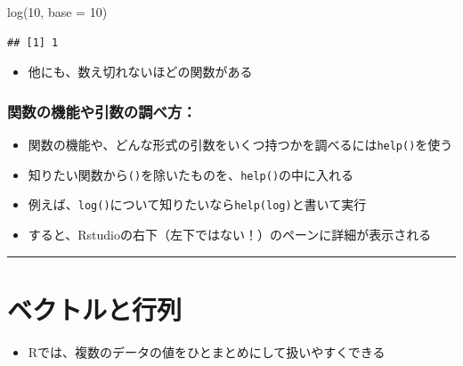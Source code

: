 \documentclass[
]{book}
\newenvironment{Shaded}{\begin{snugshade}}{\end{snugshade}}
\newcommand{\AttributeTok}[1]{\textcolor[rgb]{0.77,0.63,0.00}{#1}}
\newcommand{\DecValTok}[1]{\textcolor[rgb]{0.00,0.00,0.81}{#1}}
\newcommand{\FunctionTok}[1]{\textcolor[rgb]{0.00,0.00,0.00}{#1}}
\newcommand{\NormalTok}[1]{#1}
\providecommand{\tightlist}{%
  \setlength{\itemsep}{0pt}\setlength{\parskip}{0pt}}
\begin{document}
\begin{Shaded}
\begin{Highlighting}[]
\FunctionTok{log}\NormalTok{(}\DecValTok{10}\NormalTok{, }\AttributeTok{base =} \DecValTok{10}\NormalTok{)}
\end{Highlighting}
\end{Shaded}

\begin{verbatim}
## [1] 1
\end{verbatim}

\begin{itemize}
\tightlist
\item
  他にも、数え切れないほどの関数がある
\end{itemize}

\hypertarget{ux95a2ux6570ux306eux6a5fux80fdux3084ux5f15ux6570ux306eux8abfux3079ux65b9}{%
\subsubsection*{関数の機能や引数の調べ方：}\label{ux95a2ux6570ux306eux6a5fux80fdux3084ux5f15ux6570ux306eux8abfux3079ux65b9}}

\begin{itemize}
\tightlist
\item
  関数の機能や、どんな形式の引数をいくつ持つかを調べるには\texttt{help()}を使う
\item
  知りたい関数から\texttt{()}を除いたものを、\texttt{help()}の中に入れる
\item
  例えば、\texttt{log()}について知りたいなら\texttt{help(log)}と書いて実行
\item
  すると、Rstudioの右下（左下ではない！）のペーンに詳細が表示される
\end{itemize}

\begin{center}\rule{0.5\linewidth}{0.5pt}\end{center}

\hypertarget{ux30d9ux30afux30c8ux30ebux3068ux884cux5217}{%
\section{ベクトルと行列}\label{ux30d9ux30afux30c8ux30ebux3068ux884cux5217}}

\begin{itemize}
\tightlist
\item
  Rでは、複数のデータの値をひとまとめにして扱いやすくできる
\end{itemize}
\end{document}
